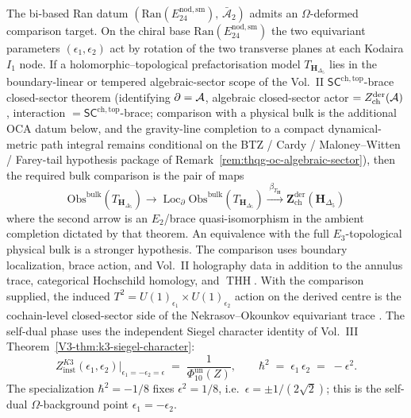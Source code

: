 \begin{remark}[Nekrasov $\Omega$-background on the bi-based datum;
self-dual phase $\epsilon_1 = -\epsilon_2$]
\label{rem:thqg-occ-omega-background}
The bi-based Ran datum
$(\mathrm{Ran}(E^{\mathrm{nod,sm}}_{24}),\,\bar{\mathcal A}_2)$
admits an $\Omega$-deformed comparison target. On the chiral base
$\mathrm{Ran}(E^{\mathrm{nod,sm}}_{24})$ the two equivariant
parameters $(\epsilon_1,\epsilon_2)$ act by rotation of the two
transverse planes at each Kodaira $I_1$ node. If a
holomorphic--topological prefactorisation model
$T_{\mathbf{H}_{\Delta_5}}$ lies in the boundary-linear or tempered
algebraic-sector scope of the Vol.~II
$\mathsf{SC}^{\mathrm{ch,top}}$-brace closed-sector theorem
\textup{(}identifying $\partial = \mathcal{A}$, algebraic closed-sector actor
$= Z^{\mathrm{der}}_{\mathrm{ch}}(\mathcal{A})$, interaction
$= \mathsf{SC}^{\mathrm{ch,top}}$-brace; comparison with a physical
bulk is the additional OCA datum below, and the gravity-line completion
to a compact dynamical-metric path integral remains conditional on
the BTZ / Cardy / Maloney--Witten / Farey-tail hypothesis package of
Remark~\ref{rem:thqg-oc-algebraic-sector}\textup{)},
then the required bulk comparison is the pair of maps
\[
\mathrm{Obs}^{\mathrm{bulk}}(T_{\mathbf{H}_{\Delta_5}})
\longrightarrow
\operatorname{Loc}_{\partial}
\mathrm{Obs}^{\mathrm{bulk}}(T_{\mathbf{H}_{\Delta_5}})
\xrightarrow{\;\beta_{T_{\mathbf H}}\;}
\mathbf{Z}^{\mathrm{der}}_{\mathrm{ch}}(\mathbf{H}_{\Delta_5})
\]
where the second arrow is an $E_2$/brace quasi-isomorphism in the
ambient completion dictated by that theorem. An equivalence with the
full $E_3$-topological physical bulk is a stronger hypothesis. The
comparison uses boundary localization, brace action, and Vol.~II
holography data in addition to the annulus trace, categorical
Hochschild homology, and $\operatorname{THH}$. With the comparison
supplied, the induced
$T^2 = U(1)_{\epsilon_1}\times U(1)_{\epsilon_2}$ action on the
derived centre is the cochain-level closed-sector side of the Nekrasov--Okounkov
equivariant trace \cite{Nekrasov2003,NekrasovOkounkov2006}. The
self-dual phase uses the independent Siegel character identity of
Vol.~III Theorem~\ref{V3-thm:k3-siegel-character}:
\[
 Z^{K3}_{\mathrm{inst}}(\epsilon_1,\epsilon_2)\big|_{\epsilon_1=-\epsilon_2=\epsilon}
 \;=\;
 \frac{1}{\Phi_{10}^{\mathrm{un}}(Z)},
 \qquad
 \hbar^2 \;=\; \epsilon_1\,\epsilon_2 \;=\; -\epsilon^2.
\]
The specialization $\hbar^2 = -1/8$ fixes
$\epsilon^2 = 1/8$, i.e.\ $\epsilon = \pm 1/(2\sqrt{2})$; this is
the self-dual $\Omega$-background point $\epsilon_1=-\epsilon_2$.

\end{remark}
